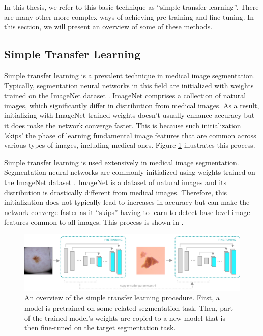 In this thesis, we refer to this basic technique as ``simple transfer learning''. There are many other more complex ways of achieving pre-training and fine-tuning. In this section, we will present an overview of some of these methods.

	\subsection{Simple Transfer Learning}
	
	Simple transfer learning is a prevalent technique in medical image segmentation. Typically, segmentation neural networks in this field are initialized with weights trained on the ImageNet dataset \cite{dengImageNetLargescaleHierarchical2009a}. ImageNet comprises a collection of natural images, which significantly differ in distribution from medical images. As a result, initializing with ImageNet-trained weights doesn't usually enhance accuracy but it does make the network converge faster. This is because such initialization 'skips' the phase of learning fundamental image features that are common across various types of images, including medical ones. Figure \ref{fig:stl-diagram} illustrates this process.
	
Simple transfer learning is used extensively in medical image segmentation. Segmentation neural networks are commonly initialized using weights trained on the ImageNet dataset \cite{dengImageNetLargescaleHierarchical2009a}. ImageNet is a dataset of natural images and its distribution is drastically different from medical images. Therefore, this initialization does not typically lead to increases in accuracy but can make the network converge faster as it ``skips'' having to learn to detect base-level image features common to all images. This process is shown in .

\begin{figure}[h!]
 \centering
 \includegraphics[width=\linewidth]{images/3/simple-transfer-learning-diagram}
 \caption{An overview of the simple transfer learning procedure. First, a model is pretrained on some related segmentation task. Then, part of the trained model's weights are copied to a new model that is then fine-tuned on the target segmentation task.}
 \label{fig:stl-diagram}
\end{figure}

